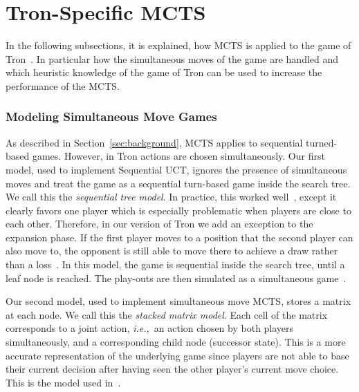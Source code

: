 \documentclass{article}
\newcommand{\ie}{{\it i.e.,}~}
\begin{document}


\section{Tron-Specific MCTS}
\label{sec:tron_specific_mcts}
In the following subsections, it is explained, how MCTS is applied to the game of Tron~\cite{teuling_tron}. In particular how the simultaneous moves of the game are handled and which heuristic knowledge of the game of Tron can be used to increase the performance of the MCTS.

\subsubsection*{Modeling Simultaneous Move Games}

As described in Section~\ref{sec:background}, MCTS applies to sequential turned-based games. However, in Tron actions are chosen simultaneously. Our first model, used to implement Sequential UCT, ignores the presence of simultaneous moves and treat the game as a sequential turn-based game inside the search tree. 
We call this the {\it sequential tree model}. 
In practice, this worked well~\cite{tron_cig,teuling_tron}, except it clearly favors one player which is especially problematic when players are close to each other. Therefore, in our version of Tron we add an exception to the expansion phase. If the first player moves to a position that the second player can also move to, the opponent is still able to move there to achieve a draw rather than a loss~\cite{teuling_tron}. 
In this model, the game is sequential inside the search tree, until a leaf node is reached. The play-outs are then simulated as a simultaneous game~\cite{teuling_tron}.

Our second model, used to implement simultaneous move MCTS, stores a matrix at each node. 
We call this the {\it stacked matrix model}.
Each cell of the matrix corresponds to a joint action, \ie an action chosen by both players simultaneously, and a corresponding child node (successor state). 
This is a more accurate representation of the underlying game since players are not able to base their current decision after having seen the other player's current move choice. 
This is the model used in~\cite{cig_paper,mcts_goofspiel}.
\end{document}

